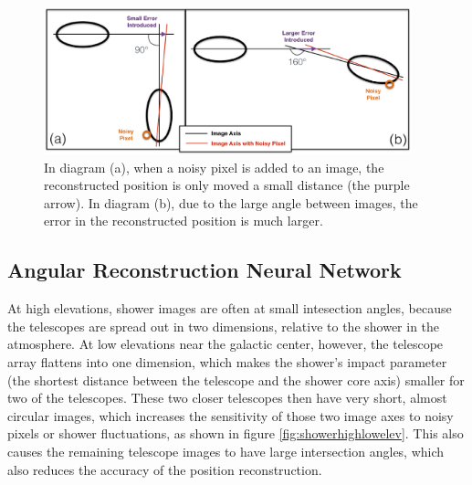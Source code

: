   \begin{figure}[ht]
    \begin{center}
      \includegraphics[width=0.95\textwidth]{images/large_angle_image_intersection_error_cropped.eps}
      \caption[Large Image Intersection Angles]{In diagram (a), when a noisy pixel is added to an image, the reconstructed position is only moved a small distance (the purple arrow).  In diagram (b), due to the large angle between images, the error in the reconstructed position is much larger.}\label{fig:largeintersectangle}
    \end{center}
  \end{figure}

  \subsection{Angular Reconstruction Neural Network}\label{subsec:disp}
    At high elevations, shower images are often at small intesection angles, because the telescopes are spread out in two dimensions, relative to the shower in the atmosphere.
    At low elevations near the galactic center, however, the telescope array flattens into one dimension, which makes the shower's impact parameter (the shortest distance between the telescope and the shower core axis) smaller for two of the telescopes.
    These two closer telescopes then have very short, almost circular images, which increases the sensitivity of those two image axes to noisy pixels or shower fluctuations, as shown in figure \ref{fig:showerhighlowelev}.
    This also causes the remaining telescope images to have large intersection angles, which also reduces the accuracy of the position reconstruction.

